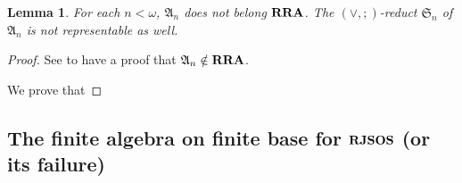 \documentclass[a4paper]{article}
\theoremstyle{defin}
\theoremstyle{theorem}
\theoremstyle{prop}
\theoremstyle{lemma}
\newtheorem{lemma}{Lemma}
\theoremstyle{ex}
\theoremstyle{col}
\begin{document}
\begin{lemma}
  For each $n < \omega$, $\mathfrak{A}_n$ does not belong ${\bf RRA}$. The $(\vee, ;)$-reduct $\mathfrak{S}_n$ of $\mathfrak{A}_n$ is not representable as well.
\end{lemma}

\begin{proof}
  See \cite{hodkinson2000axiomatizability} to have a proof that $\mathfrak{A}_n \notin {\bf RRA}$.

  We prove that  
\end{proof}

\subsection{The finite algebra on finite base for ${\bf RJSOS}$ (or its failure)}



\end{document}
